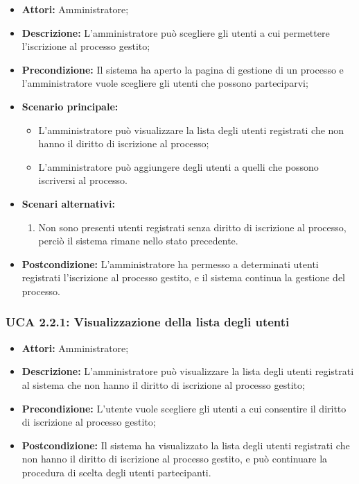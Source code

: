 \begin{itemize}
\item \textbf{Attori:}
Amministratore;
\item \textbf{Descrizione:}
L'amministratore può scegliere gli utenti a cui permettere l'iscrizione al processo gestito;
\item \textbf{Precondizione:}
Il sistema ha aperto la pagina di gestione di un processo e l'amministratore vuole scegliere gli utenti che possono parteciparvi;
\item \textbf{Scenario principale:}
\begin{itemize}
\item L'amministratore può visualizzare la lista degli utenti registrati che non hanno il diritto di iscrizione al processo;
\item L'amministratore può aggiungere degli utenti a quelli che possono iscriversi al processo.
\end{itemize}
\item \textbf{Scenari alternativi:}
\begin{enumerate}
\item Non sono presenti utenti registrati senza diritto di iscrizione al processo, perciò il sistema rimane nello stato precedente.
\end{enumerate}
\item \textbf{Postcondizione:}
L'amministratore ha permesso a determinati utenti registrati l'iscrizione al processo gestito, e il sistema continua la gestione del processo.
\end{itemize}

\hypertarget{A2.2.1}{}
\subsubsection{UCA 2.2.1: Visualizzazione della lista degli utenti}
\begin{itemize}
\item \textbf{Attori:}
Amministratore;
\item \textbf{Descrizione:}
L'amministratore può visualizzare la lista degli utenti registrati al sistema che non hanno il diritto di iscrizione al processo gestito;
\item \textbf{Precondizione:}
L'utente vuole scegliere gli utenti a cui consentire il diritto di iscrizione al processo gestito;
\item \textbf{Postcondizione:}
Il sistema ha visualizzato la lista degli utenti registrati che non hanno il diritto di iscrizione al processo gestito, e può continuare la procedura di scelta degli utenti partecipanti.
\end{itemize}

